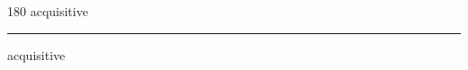 
\begin{frame}
\begin{center}
\begin{turn}{180}
{\fontsize{2.5cm}{1em}\selectfont acquisitive}
\end{turn}
\vspace{1em}\par  
\hrule
\vspace{1em}\par  
{\fontsize{2.5cm}{1em}\selectfont acquisitive}
\end{center}
\end{frame}
